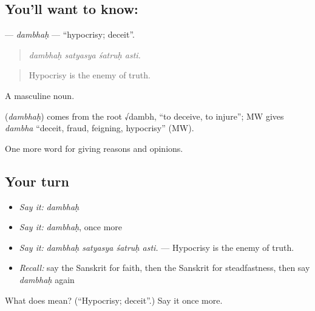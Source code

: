 \subsection*{You'll want to know: }
\textbf{} — \emph{dambhaḥ} — \textquotedblleft{}hypocrisy; deceit\textquotedblright{}.

\begin{quote}
   
\end{quote}

\begin{quote}
\emph{dambhaḥ satyasya śatruḥ asti.}
\end{quote}

\begin{quote}
Hypocrisy is the enemy of truth.
\end{quote}

A masculine noun.

\begin{cousinweb}
\textbf{} (\emph{dambhaḥ}) comes from the root √dambh, \textquotedblleft{}to deceive, to injure\textquotedblright{}; MW gives \emph{dambha} \textquotedblleft{}deceit, fraud, feigning, hypocrisy\textquotedblright{} (MW).
\end{cousinweb}

\begin{grammarlens}[title={What you've built}]
One more word for giving reasons and opinions.
\end{grammarlens}

\subsection*{Your turn}
\begin{itemize}
\raggedright
  \item \emph{Say it:} \emph{dambhaḥ}
  \item \emph{Say it:} \emph{dambhaḥ}, once more
  \item \emph{Say it:} \emph{dambhaḥ satyasya śatruḥ asti.} — Hypocrisy is the enemy of truth.
  \item \emph{Recall:} say the Sanskrit for faith, then the Sanskrit for steadfastness, then say \emph{dambhaḥ} again
\end{itemize}

\begin{tcolorbox}[breakable,colback=teal!4,colframe=teal!35!black,title={Before you move on}]
What does  mean? (\textquotedblleft{}Hypocrisy; deceit\textquotedblright{}.) Say it once more.
\end{tcolorbox}
